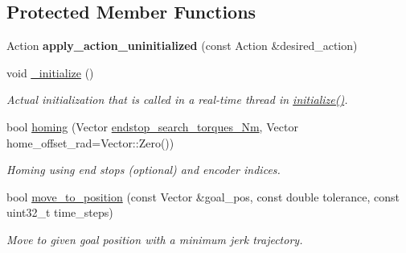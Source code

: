 \subsection*{Protected Member Functions}
\begin{DoxyCompactItemize}
\item 
\mbox{\label{classblmc__robots_1_1NJointBlmcRobotDriver_aeca6dbdd22e3b40afe89fecf2895dcad}} 
Action {\bfseries apply\+\_\+action\+\_\+uninitialized} (const Action \&desired\+\_\+action)
\item 
void \hyperlink{classblmc__robots_1_1NJointBlmcRobotDriver_aafa20130f746b5cc35eae43ce36e23c6}{\+\_\+initialize} ()
\begin{DoxyCompactList}\small\item\em Actual initialization that is called in a real-\/time thread in \hyperlink{classblmc__robots_1_1NJointBlmcRobotDriver_a7a1ece2b5d4f0f607a4d0516543b0d48}{initialize()}. \end{DoxyCompactList}\item 
bool \hyperlink{classblmc__robots_1_1NJointBlmcRobotDriver_aa2948efef69215afb233fc63acf88d3f}{homing} (Vector \hyperlink{n__joint__blmc__robot__driver_8hpp_a8f0c3d2c5211dc9fd38c4d64bdcf77cb}{endstop\+\_\+search\+\_\+torques\+\_\+\+Nm}, Vector home\+\_\+offset\+\_\+rad=Vector\+::\+Zero())
\begin{DoxyCompactList}\small\item\em Homing using end stops (optional) and encoder indices. \end{DoxyCompactList}\item 
bool \hyperlink{classblmc__robots_1_1NJointBlmcRobotDriver_ab29cab22a765bce463f367b6e6dc82ff}{move\+\_\+to\+\_\+position} (const Vector \&goal\+\_\+pos, const double tolerance, const uint32\+\_\+t time\+\_\+steps)
\begin{DoxyCompactList}\small\item\em Move to given goal position with a minimum jerk trajectory. \end{DoxyCompactList}\end{DoxyCompactItemize}
